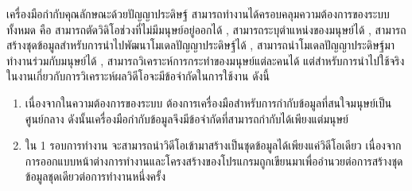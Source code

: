 เครื่องมือกำกับคุณลักษณะด้วยปัญญาประดิษฐ์ สามารถทำงานได้ครอบคลุมความต้องการของระบบทั้งหมด คือ สามารถตัดวิดิโอช่วงที่ไม่มีมนุษย์อยู่ออกได้ , สามารถระบุตำแหน่งของมนุษย์ได้ , สามารถสร้างชุดข้อมูลสำหรับการนำไปพัฒนาโมเดลปัญญาประดิษฐ์ได้ , สามารถนำโมเดลปัญญาประดิษฐ์มาทำงานร่วมกับมนุษย์ได้ , สามารถวิเคราะห์การกระทำของมนุษย์แต่ละคนได้ แต่สำหรับการนำไปใช้จริงในงานเกี่ยวกับการวิเคราะห์ผลวิดีโอจะมีข้อจำกัดในการใช้งาน ดังนี้
\begin{enumerate}
	\item เนื่องจากในความต้องการของระบบ ต้องการเครื่องมือสำหรับการกำกับข้อมูลที่สนใจมนุษย์เป็นศูนย์กลาง ดังนั้นเครื่องมือกำกับข้อมูลจึงมีข้อจำกัดที่สามารถกำกับได้เพียงแต่มนุษย์
	\item ใน 1 รอบการทำงาน จะสามารถนำวิดีโอเข้ามาสร้างเป็นชุดข้อมูลได้เพียงแค่วิดีโอเดียว เนื่องจาก การออกแบบหน้าต่างการทำงานและโครงสร้างของโปรแกรมถูกเขียนมาเพื่ออำนวยต่อการสร้างชุดข้อมูลชุดเดียวต่อการทำงานหนึ่งครั้ง
\end{enumerate}	
